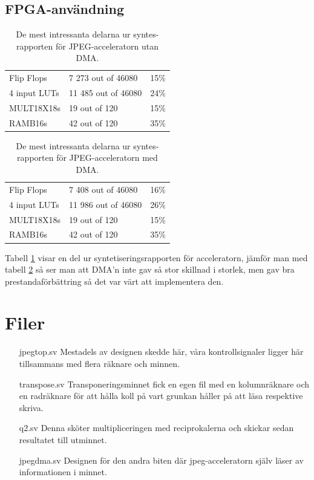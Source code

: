\documentclass[a4paper]{article}
\begin{document}
\subsection{FPGA-användning}
\begin{table}[H]
    \centering
    \begin{tabular}{l l l}
        Flip Flops   &      7 273 out of   46080  & 15\% \\
        4 input LUTs &      11 485 out of  46080  & 24\% \\
        MULT18X18s   &      19 out of 120  &   15\% \\
        RAMB16s      &      42 out of 120  &   35\% \\
    \end{tabular}
    \caption{ De mest intressanta delarna ur syntes-rapporten för JPEG-acceleratorn utan DMA. }
    \label{tab:fpga_usage2}
\end{table}
\begin{table}[H]
    \centering
    \begin{tabular}{l l l}
        Flip Flops   &      7 408 out of   46080  & 16\% \\
        4 input LUTs &      11 986 out of  46080  & 26\% \\
        MULT18X18s   &      19 out of 120  &   15\% \\
        RAMB16s      &      42 out of 120  &   35\% \\
    \end{tabular}
    \caption{ De mest intressanta delarna ur syntes-rapporten för JPEG-acceleratorn med DMA. }
    \label{tab:fpga_usage3}
\end{table}

Tabell \ref{tab:fpga_usage2} visar en del ur syntetiseringsrapporten för acceleratorn, jämför man med tabell \ref{tab:fpga_usage3} så ser man att DMA\rq{}n inte gav så stor skillnad i storlek, men gav bra prestandaförbättring så det var värt att implementera den.

\section{Filer}
\begin{itemize}
        \item [jpegtop.sv] Mestadels av designen skedde här, våra kontrollsignaler ligger här tillsammans med flera räknare och minnen.
        \item [transpose.sv] Transponeringsminnet fick en egen fil med en kolumnräknare och en radräknare för att hålla koll på vart grunkan håller på att läsa respektive skriva.
        \item [q2.sv] Denna sköter multipliceringen med reciprokalerna och skickar sedan resultatet till utminnet.
        \item [jpegdma.sv] Designen för den andra biten där jpeg-acceleratorn själv läser av informationen i minnet.
\end{itemize}
\end{document}

